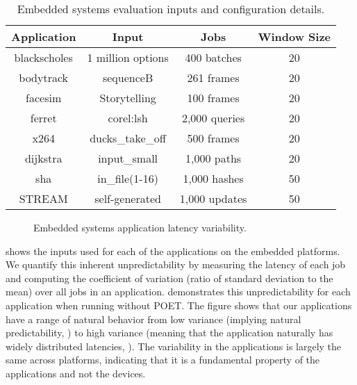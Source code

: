 \begin{table}[t]
\small
\centering
\caption{Embedded systems evaluation inputs and configuration details.}
\begin{tabular}{cccc}
  \textbf{Application} & \textbf{Input} & \textbf{Jobs} & \textbf{Window Size} \\
  \hline
  \hline
  blackscholes   & 1 million options              & 400 batches   & 20 \\
  bodytrack      & sequenceB                      & 261 frames    & 20 \\
  facesim        & Storytelling                   & 100 frames    & 20 \\
  ferret         & corel:lsh                      & 2,000 queries & 20 \\
  x264           & ducks\_take\_off               & 500 frames    & 20 \\
  dijkstra       & input\_small                   & 1,000 paths   & 20 \\
  sha            & in\_file(1-16)                 & 1,000 hashes  & 50 \\
  STREAM         & self-generated                 & 1,000 updates & 50 \\
  \hline
  \hline
\end{tabular}
\label{tbl:poet-embedded-inputs}
\end{table}

\begin{figure}[t]
  \centering
  
  \caption{Embedded systems application latency variability.}
  \label{fig:poet-embedded-variation}
\end{figure}

 shows the inputs used for each of the applications on the embedded platforms.
We quantify this inherent unpredictability by measuring the latency of each job and computing the coefficient of variation (ratio of standard deviation to the mean) over all jobs in an application.
 demonstrates this unpredictability for each application when running without POET.
The figure shows that our applications have a range of natural behavior from low variance (implying natural predictability, \eg {}) to high variance (meaning that the application naturally has widely distributed latencies, \eg {}).
The variability in the applications is largely the same across platforms, indicating that it is a fundamental property of the applications and not the devices.

